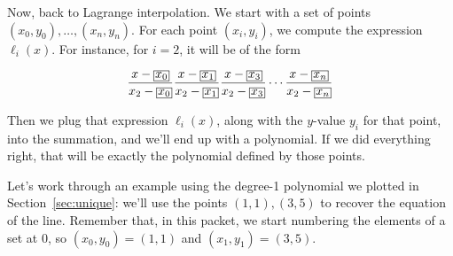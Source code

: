 Now, back to Lagrange interpolation. We start with a set of points $(x_0, y_0), 
\ldots,\allowbreak (x_n, y_n)$. For each point $(x_i, y_i)$, we compute the 
expression $\ell_i(x)$. For instance, for $i=2$, it will be of the form

\newcommand{\cyan}[1]{\textcolor{cyan}{#1}}
\[
    \setlength{\fboxsep}{.3\fboxsep}
    \frac{x-\boxed{x_0}}{x_2-\boxed{x_0}}
    \frac{x-\boxed{x_1}}{x_2-\boxed{x_1}}
    \frac{x-\boxed{x_3}}{x_2-\boxed{x_3}}
    \cdots
    \frac{x-\boxed{x_n}}{x_2-\boxed{x_n}}
\]

Then we plug that expression $\ell_i(x)$, along with the $y$-value $y_i$ 
for that point, into the summation, and we'll end up with a polynomial. 
If we did everything right, that will be exactly the polynomial defined 
by those points.

Let's work through an example using the degree-1 polynomial we plotted in Section~\ref{sec:unique}:
we'll use the points $(1,1), (3,5)$ to recover the equation of the line. Remember that,
in this packet, we start numbering the elements of a set at 0, so $(x_0,y_0)
= (1,1)$ and $(x_1, y_1) = (3,5)$.


